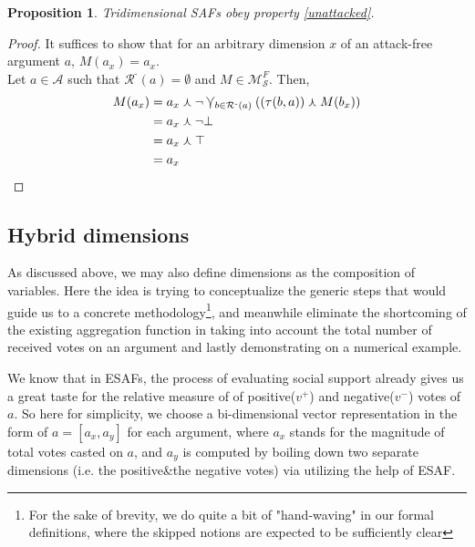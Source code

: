 \documentclass{article}
\newtheorem{proposition}{Proposition}
\newcommand{\args}{\mathcal{A}} %
\newcommand{\att}{\mathcal{R}}  %
\newcommand{\attackers}[1]{\att^\text{-}\left(#1\right)}
\newcommand{\modelset}{\mathcal{M}}   %
\newcommand{\tupd}{\curlywedge}
\newcommand{\Tatt}{\varcurlyvee}
\begin{document}
\begin{proposition}
Tridimensional SAFs obey property \ref{unattacked}.
\end{proposition}

\begin{proof}
It suffices to show that for an arbitrary dimension $x$ of an attack-free argument $a$, $M(a_x) = a_x.$\\


Let $a \in \args$ such that $\attackers a = \emptyset$ and $M\in\mathcal{M}_{\mathcal{S}}^{F}$. Then, %
  \begin{align*}
    M(a_x) &= a_x \tupd \neg \Tatt_{b \in \attackers a} ((\tau(b, a)) \tupd M(b_x)) \\
         &= a_x \tupd \neg \bot \\
	 &= a_x \tupd \top \\
         &= a_x
  \end{align*}

\end{proof}



\subsection{Hybrid dimensions}

As discussed above, we may also define dimensions as the composition of variables. Here the idea is trying to conceptualize the generic steps that would guide us to a concrete methodology\footnote{For the sake of brevity, we do quite a bit of "hand-waving" in our formal definitions, where the skipped notions are expected to be sufficiently clear}, and meanwhile eliminate the shortcoming of the existing aggregation function in taking into account the total number of received votes on an argument and lastly demonstrating on a numerical example.

We know that in ESAFs, the process of evaluating social support already gives us a great taste for the relative measure of  of positive($v^{+}$) and negative($v^{-}$) votes of $a$. So here for simplicity, we choose a bi-dimensional vector representation in the form of $ a = [a_{x}, a_{y}]$ for each argument, where $a_{x}$ stands for the magnitude of total votes casted on $a$, and $a_{y}$ is computed by boiling down two separate dimensions (i.e.  the positive\&the negative votes) via utilizing the help of ESAF.
\end{document}
